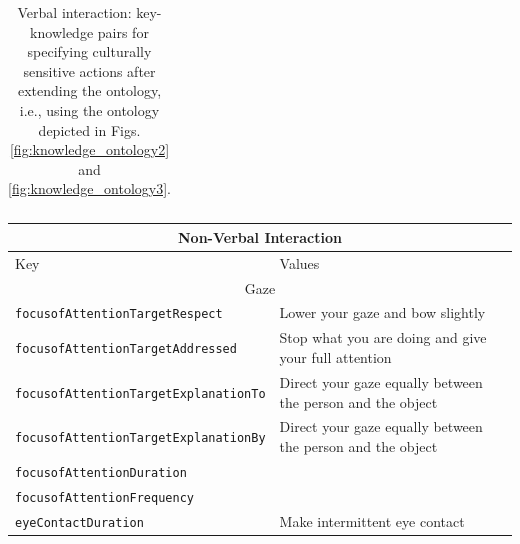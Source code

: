 \documentclass{CSSRforAfrica}
\begin{document}
\begin{table}[H]
\begin{center}
\begin{tabular}{|l l|}
\hline \hline
\end{tabular}
\end{center}
\caption{Verbal interaction: key-knowledge pairs for specifying culturally sensitive actions after extending the ontology, i.e., using the ontology depicted in Figs. \ref{fig:knowledge_ontology2} and \ref{fig:knowledge_ontology3}.}
\label{table:key-knowledge_pairs2}
\end{table}

 
\begin{table}[H]
\begin{center}
\begin{tabular}{|l l|}
\hline \hline
\multicolumn{2}{|c|}{{\small \bf Non-Verbal Interaction}} \\
\hline \hline
 {\small  Key  }                                         &  {\small Values }      \\
\hline
\multicolumn{2}{|c|}{{\footnotesize Gaze}}  \vspace{-0.75mm}\\
\hline
{\footnotesize \verb+focusofAttentionTargetRespect+}      & {\footnotesize \verb++ Lower your gaze and bow slightly} \vspace{-1.01mm}\\
{\footnotesize \verb+focusofAttentionTargetAddressed+}  & {\footnotesize \verb++ Stop what you are doing and give your full attention} \vspace{-1.01mm}\\
{\footnotesize \verb+focusofAttentionTargetExplanationTo+} 	    & {\footnotesize \verb++ Direct your gaze equally between the person and the object}\vspace{-1.01mm} \\
{\footnotesize \verb+focusofAttentionTargetExplanationBy+} 	    & {\footnotesize \verb++ Direct your gaze equally between the person and the object}\vspace{-1.01mm} \\
{\footnotesize \verb+focusofAttentionDuration+}     & {\footnotesize \verb++ } \vspace{-1.01mm}\\
{\footnotesize \verb+focusofAttentionFrequency+}   & {\footnotesize \verb++} \vspace{-1.01mm}\\
{\footnotesize \verb+eyeContactDuration+}                             & {\footnotesize \verb++ Make intermittent eye contact} \vspace{-1.01mm}\\

\end{tabular}
\end{center}
\end{table}
\end{document}
